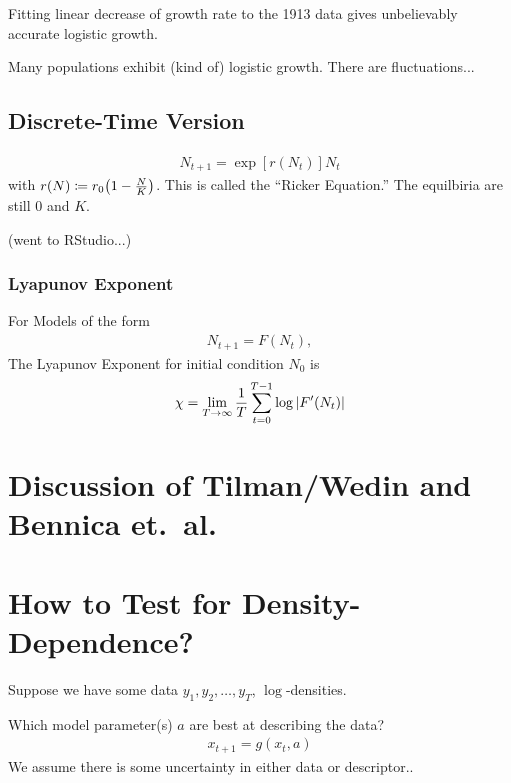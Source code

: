 \documentclass{article}
\begin{document}
    Fitting linear decrease of growth rate to the 1913 data gives unbelievably accurate logistic growth.

    Many populations exhibit (kind of) logistic growth.  There are fluctuations...

    \subsection{Discrete-Time Version}
    \begin{align*}
        N_{t+1} = \exp[r(N_t)]N_t
    \end{align*}
    with $r(N) \coloneqq r_0\qty(1 - \frac{N}{K})$.  This is called the ``Ricker Equation.''
    The equilbiria are still $0$ and $K$.

    (went to RStudio...)

    \subsubsection{Lyapunov Exponent}

    For Models of the form
    \begin{align*}
        N_{t+1} = F(N_t),
    \end{align*}
    The Lyapunov Exponent for initial condition $N_0$ is
    \begin{align*}
        \chi = \lim_{T\rightarrow\infty} \frac{1}{T}\sum_{t=0}^{T-1}\log\abs{F'(N_t)}
    \end{align*}

    \section{Discussion of Tilman/Wedin and Bennica et.~al.}

    \section{How to Test for Density-Dependence?}

    Suppose we have some data $y_1, y_2, \dots, y_T$, $\log$-densities.

    Which model parameter(s) $a$ are best at describing the data?
    \begin{align*}
        x_{t+1} = g(x_t, a)
    \end{align*}
    We assume there is some uncertainty in either data or descriptor..
\end{document}
